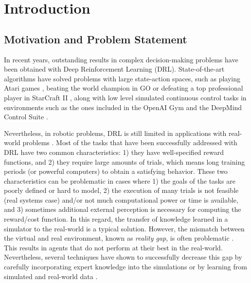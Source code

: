 \chapter{Introduction}
\section{Motivation and Problem Statement}
In  recent years, outstanding results in complex decision-making problems have been obtained with Deep Reinforcement Learning (DRL). State-of-the-art algorithms have solved problems with large state-action spaces, such as playing Atari games \cite{atari}, beating the world champion in GO \cite{Silver2016} or defeating a top professional player in StarCraft II \cite{alphastarblog}, along with low level simulated continuous control tasks in environments such as the ones included in the OpenAI Gym \cite{brockman2016openai} and the DeepMind Control Suite \cite{tassa2018deepmind}. 

Nevertheless, in robotic problems, DRL is still limited in applications with real-world problems \cite{Gu2017}. Most of the tasks that have been successfully addressed with DRL have two common characteristics: 1) they have well-specified reward functions, and 2) they require large amounts of trials, which means long training periods (or powerful computers) to obtain a satisfying behavior. These two characteristics can be problematic in cases where 1) the goals of the tasks are poorly defined or hard to model, 2) the execution of many trials is not feasible (real systems case) and/or not much computational power or time is available, and 3) sometimes additional external perception is necessary for computing the reward/cost function. In this regard, the transfer of knowledge learned in a simulator to the real-world is a typical solution. However, the mismatch between the virtual and real environment, known as \emph{reality gap}, is often problematic \cite{koos2013transferability}. This results in agents that do not perform at their best in the real-world. Nevertheless, several techniques have shown to successfully decrease this gap by carefully incorporating expert knowledge into the simulations \cite{lobos2018visual, tan2018sim} or by learning from simulated and real-world data \cite{farchy2013humanoid, lee2019robust}.

